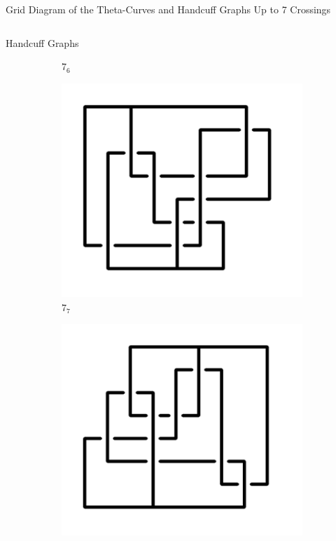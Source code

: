 \documentclass[final]{beamer}
\begin{document}
\begin{frame}[t]
\begin{alertblock}{Grid Diagram of the Theta-Curves and Handcuff Graphs Up to 7 Crossings}
\begin{columns}[t]
\begin{column}{0.5\textwidth}
\begin{alertblock}{Handcuff Graphs}
\begin{figure}
\begin{subfigure}{0.075\textwidth}
    \caption{$7_{6}$} 
    \end{subfigure}
    \begin{subfigure}{0.075\textwidth}
    \includegraphics[width=\columnwidth]{../Midterm_Poster/grid_diagram/handcuff_7_7.png}
    \caption{$7_{7}$} 
    \end{subfigure}
    \begin{subfigure}{0.075\textwidth}
    \includegraphics[width=\columnwidth]{../Midterm_Poster/grid_diagram/handcuff_7_8.png}

\end{subfigure}
\end{figure}
\end{alertblock}
\end{column}
\end{columns}
\end{alertblock}
\end{frame}
\end{document}

